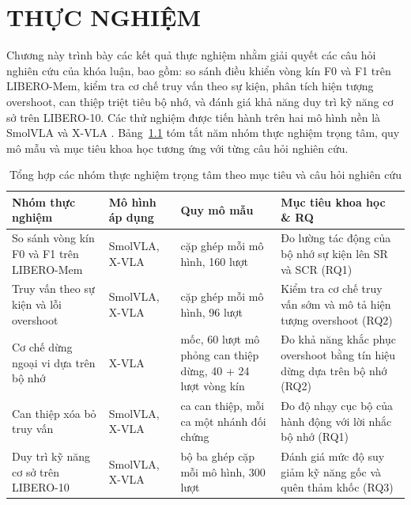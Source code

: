 \chapter{THỰC NGHIỆM}

Chương này trình bày các kết quả thực nghiệm nhằm giải quyết các câu hỏi nghiên cứu của khóa luận, bao gồm: so sánh điều khiển vòng kín F0 và F1 trên LIBERO-Mem, kiểm tra cơ chế truy vấn theo sự kiện, phân tích hiện tượng overshoot, can thiệp triệt tiêu bộ nhớ, và đánh giá khả năng duy trì kỹ năng cơ sở trên LIBERO-10. Các thử nghiệm được tiến hành trên hai mô hình nền là SmolVLA \cite{smolvla2025} và X-VLA \cite{xvla2025}. Bảng~\ref{tab:experiment-rq-map} tóm tắt năm nhóm thực nghiệm trọng tâm, quy mô mẫu và mục tiêu khoa học tương ứng với từng câu hỏi nghiên cứu.

\begin{table}[htbp]
\centering\small
\caption{Tổng hợp các nhóm thực nghiệm trọng tâm theo mục tiêu và câu hỏi nghiên cứu}
\label{tab:experiment-rq-map}
\setlength{\tabcolsep}{4pt}
\begin{tabular}{|>{\raggedright\arraybackslash}p{}|>{\raggedright\arraybackslash}p{}|>{\raggedright\arraybackslash}p{}|>{\raggedright\arraybackslash}p{}|}
\hline
\textbf{Nhóm thực nghiệm} & \textbf{Mô hình áp dụng} & \textbf{Quy mô mẫu} & \textbf{Mục tiêu khoa học \& RQ} \\ \hline
So sánh vòng kín F0 và F1 trên LIBERO-Mem & SmolVLA, X-VLA & 40 cặp ghép mỗi mô hình, 160 lượt & Đo lường tác động của bộ nhớ sự kiện lên SR và SCR (RQ1) \\ \hline
Truy vấn theo sự kiện và lỗi overshoot & SmolVLA, X-VLA & 24 cặp ghép mỗi mô hình, 96 lượt & Kiểm tra cơ chế truy vấn sớm và mô tả hiện tượng overshoot (RQ2) \\ \hline
Cơ chế dừng ngoại vi dựa trên bộ nhớ & X-VLA & 35 mốc, 60 lượt mô phỏng can thiệp dừng, 40 + 24 lượt vòng kín & Đo khả năng khắc phục overshoot bằng tín hiệu dừng dựa trên bộ nhớ (RQ2) \\ \hline
Can thiệp xóa bỏ truy vấn & SmolVLA, X-VLA & 3 ca can thiệp, mỗi ca một nhánh đối chứng & Đo độ nhạy cục bộ của hành động với lời nhắc bộ nhớ (RQ1) \\ \hline
Duy trì kỹ năng cơ sở trên LIBERO-10 & SmolVLA, X-VLA & 50 bộ ba ghép cặp mỗi mô hình, 300 lượt & Đánh giá mức độ suy giảm kỹ năng gốc và quên thảm khốc (RQ3) \\ \hline
\end{tabular}
\end{table}

